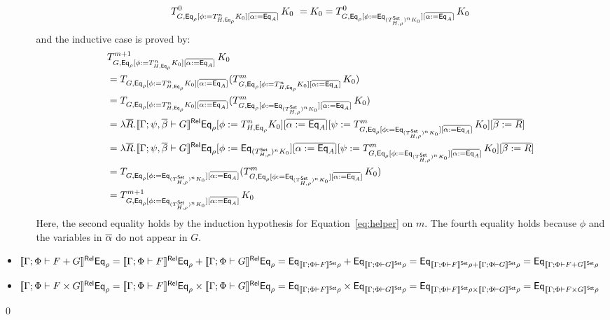 \documentclass{lmcs}
\theoremstyle{plain}\newtheorem{satz}[thm]{Satz}
\newcommand{\set}{\mathsf{Set}}
\begin{document}
\begin{itemize}
\begin{itemize}
\[T^0_{G,
  \Eq_{\rho}[\phi := T^{n}_{H,\Eq_{\rho}} K_0][\overline{\alpha :=
      \Eq_A}]}\,K_0 \ = K_0 = T^0_{G, \Eq_{\rho}[\phi :=
    \Eq_{(T^{\set}_{H,\rho})^n K_0}][\overline{\alpha :=
      \Eq_A}]}\,K_0\]
and the inductive case is proved by: \\
\begin{align*}
& T^{m+1}_{G, \Eq_{\rho}[\phi := T^{n}_{H,\Eq_{\rho}} K_0][\overline{\alpha := \Eq_A}]}\,K_0 \\
&= T_{G, \Eq_{\rho}[\phi := T^{n}_{H,\Eq_{\rho}} K_0][\overline{\alpha
        := \Eq_A}]} (T^{m}_{G, \Eq_{\rho}[\phi := T^{n}_{H,\Eq_{\rho}}
      K_0][\overline{\alpha := \Eq_A}]}\,K_0) \\
&= T_{G, \Eq_{\rho}[\phi := T^{n}_{H,\Eq_{\rho}} K_0][\overline{\alpha
        := \Eq_A}]} (T^{m}_{G, \Eq_{\rho}[\phi :=
      \Eq_{(T^{\set}_{H,\rho})^n K_0}][\overline{\alpha :=
        \Eq_A}]}\,K_0) \\
&= \lambda \ol{R}. \relsem{\Gamma; \psi,
    \ol\beta \vdash G} \Eq_{\rho} [\phi := T^{n}_{H,\Eq_{\rho}}
    K_0][\overline{\alpha := \Eq_A}][\psi := T^{m}_{G, \Eq_{\rho}[\phi
        := \Eq_{(T^{\set}_{H,\rho})^n K_0}][\overline{\alpha :=
          \Eq_A}]}\,K_0][\overline{\beta := R}] \\
&= \lambda \ol{R}. \relsem{\Gamma; \psi,
    \ol\beta \vdash G} \Eq_{\rho} [\phi := \Eq_{(T^{\set}_{H,\rho})^n
      K_0}][\overline{\alpha := \Eq_A}][\psi := T^{m}_{G,
      \Eq_{\rho}[\phi := \Eq_{(T^{\set}_{H,\rho})^n
          K_0}][\overline{\alpha := \Eq_A}]}\,K_0][\overline{\beta :=
      R}] \\
&= T_{G, \Eq_{\rho}[\phi := \Eq_{(T^{\set}_{H,\rho})^n
        K_0}][\overline{\alpha := \Eq_A}]} (T^{m}_{G, \Eq_{\rho}[\phi
      := \Eq_{(T^{\set}_{H,\rho})^n K_0}][\overline{\alpha :=
        \Eq_A}]}\,K_0) \\
&= T^{m+1}_{G, \Eq_{\rho}[\phi := \Eq_{(T^{\set}_{H,\rho})^n
        K_0}][\overline{\alpha := \Eq_A}]}\,K_0
\end{align*}
Here, the second equality holds by the induction hypothesis for
Equation~\ref{eq:helper} on $m$. The fourth equality holds because
$\phi$ and the variables in $\overline{\alpha}$ do not appear in
$G$. 
\end{itemize}
\item $\relsem{\Gamma; \Phi \vdash F + G} \Eq_{\rho} =
  \relsem{\Gamma; \Phi \vdash F} \Eq_{\rho} + \relsem{\Gamma;
    \Phi \vdash G} \Eq_{\rho} = \Eq_{\setsem{\Gamma; \Phi \vdash
      F}\rho} + \Eq_{\setsem{\Gamma; \Phi \vdash G}\rho} =
  \Eq_{\setsem{\Gamma; \Phi \vdash F}\rho + \setsem{\Gamma; \Phi
      \vdash G}\rho} = \Eq_{\setsem{\Gamma; \Phi \vdash F +
      G}\rho}$
\item $\relsem{\Gamma; \Phi \vdash F \times G} \Eq_{\rho} =
  \relsem{\Gamma; \Phi \vdash F}\Eq_{\rho} \times \relsem{\Gamma;
    \Phi \vdash G}\Eq_{\rho} = \Eq_{\setsem{\Gamma; \Phi \vdash
      F}\rho} \times \Eq_{\setsem{\Gamma; \Phi \vdash G}\rho}
  = \Eq_{\setsem{\Gamma; \Phi \vdash F}\rho \times
    \setsem{\Gamma; \Phi \vdash G}\rho} = \Eq_{\setsem{\Gamma;
      \Phi \vdash F \times G}\rho}$
\end{itemize}
\qed
\end{document}
